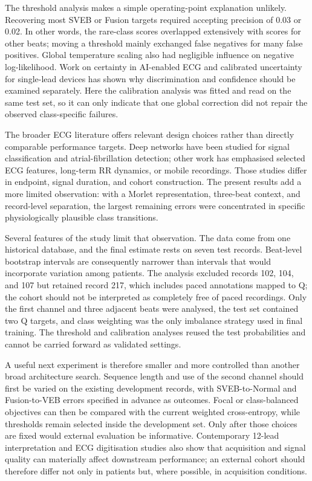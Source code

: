 The threshold analysis makes a simple operating-point explanation unlikely. Recovering most SVEB or Fusion targets required accepting precision of 0.03 or 0.02. In other words, the rare-class scores overlapped extensively with scores for other beats; moving a threshold mainly exchanged false negatives for many false positives. Global temperature scaling also had negligible influence on negative log-likelihood. Work on certainty in AI-enabled ECG and calibrated uncertainty for single-lead devices has shown why discrimination and confidence should be examined separately\cite{demolder2024certainty,doggart2025singlelead}. Here the calibration analysis was fitted and read on the same test set, so it can only indicate that one global correction did not repair the observed class-specific failures.

The broader ECG literature offers relevant design choices rather than directly comparable performance targets. Deep networks have been studied for signal classification and atrial-fibrillation detection\cite{mantravadi2024clinet,vainoryte2025diagnostic}; other work has emphasised selected ECG features, long-term RR dynamics, or mobile recordings\cite{petmezas2026optimizing,pukkila2026chronic,tuboly2026malignant}. Those studies differ in endpoint, signal duration, and cohort construction. The present results add a more limited observation: with a Morlet representation, three-beat context, and record-level separation, the largest remaining errors were concentrated in specific physiologically plausible class transitions.

Several features of the study limit that observation. The data come from one historical database, and the final estimate rests on seven test records. Beat-level bootstrap intervals are consequently narrower than intervals that would incorporate variation among patients. The analysis excluded records 102, 104, and 107 but retained record 217, which includes paced annotations mapped to Q; the cohort should not be interpreted as completely free of paced recordings. Only the first channel and three adjacent beats were analysed, the test set contained two Q targets, and class weighting was the only imbalance strategy used in final training. The threshold and calibration analyses reused the test probabilities and cannot be carried forward as validated settings.

A useful next experiment is therefore smaller and more controlled than another broad architecture search. Sequence length and use of the second channel should first be varied on the existing development records, with SVEB-to-Normal and Fusion-to-VEB errors specified in advance as outcomes. Focal or class-balanced objectives can then be compared with the current weighted cross-entropy, while thresholds remain selected inside the development set. Only after those choices are fixed would external evaluation be informative. Contemporary 12-lead interpretation and ECG digitisation studies also show that acquisition and signal quality can materially affect downstream performance\cite{herman2024validation,demolder2025digitization}; an external cohort should therefore differ not only in patients but, where possible, in acquisition conditions.
